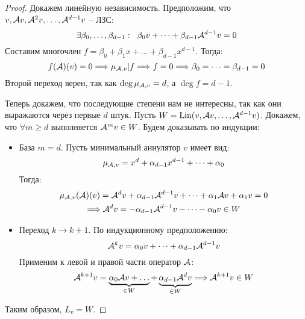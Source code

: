 \begin{proof}
    Докажем линейную независимость.
    Предположим, что $v, \mathcal{A} v, \mathcal{A}^2 v, \dots, \mathcal{A}^{d - 1} v $ -- ЛЗС:
    \[ \exists \beta_0, \dots, \beta_{d-1} : \;\; \beta_0 v + \dots + \beta_{d - 1} \mathcal{A}^{d - 1} v = 0 \]
    \quad Составим многочлен $f = \beta_0 + \beta_1 x + \dots + \beta_{d - 1} x^{d - 1}$. 
    Тогда: \[ f(\mathcal{A})(v) = 0 \Longrightarrow \mu_{\mathcal{A}, v} | f \Longrightarrow f = 0 \Longrightarrow \beta_0 = \dots = \beta_{d - 1} = 0 \]
    \quad Второй переход верен, так как $\deg \mu_{\mathcal{A}, v} = d$, а $\deg f = d - 1$.
    
    \quad Теперь докажем, что последующие степени нам не интересны, так как они выражаются через первые $d$ штук.
    Пусть $W = \operatorname{Lin} (v, \mathcal{A} v, \dots, \mathcal{A}^{d - 1} v)$. 
    Докажем, что $\forall m \geqslant d$ выполняется $\mathcal{A}^m v \in W$.
    Будем доказывать по индукции: \begin{itemize}
        \item База $m = d$. Пусть минимальный аннулятор $v$ имеет вид: \[ \mu_{\mathcal{A}, v} = x^d + \alpha_{d - 1} x^{d - 1} + \dots + \alpha_0 \]
        Тогда: \begin{gather*}
            \mu_{\mathcal{A}, v}(\mathcal{A})(v) = \mathcal{A}^dv + \alpha_{d - 1} \mathcal{A}^{d - 1}v + \dots + \alpha_1 \mathcal{A} v + \alpha_1 v = 0 \\
            \Longrightarrow \mathcal{A}^d v = - \alpha_{d - 1} \mathcal{A}^{d - 1}v - \dots - \alpha_0 v \in W
        \end{gather*}
        \item Переход $k \to k + 1$.  
        По индукционному предположению: \[ \mathcal{A}^k v = \alpha_0 v + \dots + \alpha_{d - 1} \mathcal{A}^{d - 1}v \]
        Применим к левой и правой части оператор $\mathcal{A}$: \[ \mathcal{A}^{k+1}v = \underbrace{\alpha_0\mathcal{A} v + \dots}_{\in W} + \underbrace{\alpha_{d-1}\mathcal{A}^d v}_{\in W} \Longrightarrow \mathcal{A}^{k+1}v \in W \]
    \end{itemize}
    \quad Таким образом, $L_v = W$.
\end{proof}

